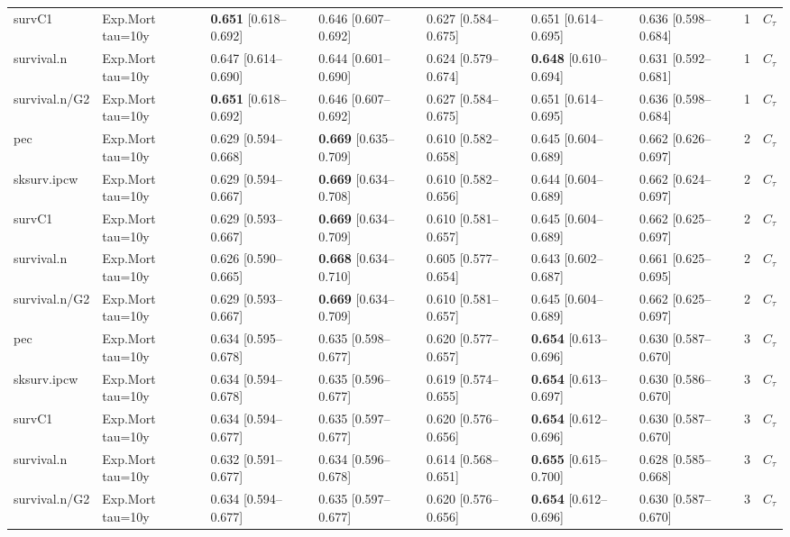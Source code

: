 \begin{tabular}{lllllllrl}
survC1 & Exp.Mort tau=10y & \textbf{0.651} [0.618–0.692] & 0.646 [0.607–0.692] & 0.627 [0.584–0.675] & 0.651 [0.614–0.695] & 0.636 [0.598–0.684] & 1 & $C_{\tau}$\\
survival.n & Exp.Mort tau=10y & 0.647 [0.614–0.690] & 0.644 [0.601–0.690] & 0.624 [0.579–0.674] & \textbf{0.648} [0.610–0.694] & 0.631 [0.592–0.681] & 1 & $C_{\tau}$\\
survival.n/G2 & Exp.Mort tau=10y & \textbf{0.651} [0.618–0.692] & 0.646 [0.607–0.692] & 0.627 [0.584–0.675] & 0.651 [0.614–0.695] & 0.636 [0.598–0.684] & 1 & $C_{\tau}$\\
\addlinespace
pec & Exp.Mort tau=10y & 0.629 [0.594–0.668] & \textbf{0.669} [0.635–0.709] & 0.610 [0.582–0.658] & 0.645 [0.604–0.689] & 0.662 [0.626–0.697] & 2 & $C_{\tau}$\\
sksurv.ipcw & Exp.Mort tau=10y & 0.629 [0.594–0.667] & \textbf{0.669} [0.634–0.708] & 0.610 [0.582–0.656] & 0.644 [0.604–0.689] & 0.662 [0.624–0.697] & 2 & $C_{\tau}$\\
survC1 & Exp.Mort tau=10y & 0.629 [0.593–0.667] & \textbf{0.669} [0.634–0.709] & 0.610 [0.581–0.657] & 0.645 [0.604–0.689] & 0.662 [0.625–0.697] & 2 & $C_{\tau}$\\
survival.n & Exp.Mort tau=10y & 0.626 [0.590–0.665] & \textbf{0.668} [0.634–0.710] & 0.605 [0.577–0.654] & 0.643 [0.602–0.687] & 0.661 [0.625–0.695] & 2 & $C_{\tau}$\\
survival.n/G2 & Exp.Mort tau=10y & 0.629 [0.593–0.667] & \textbf{0.669} [0.634–0.709] & 0.610 [0.581–0.657] & 0.645 [0.604–0.689] & 0.662 [0.625–0.697] & 2 & $C_{\tau}$\\
\addlinespace
pec & Exp.Mort tau=10y & 0.634 [0.595–0.678] & 0.635 [0.598–0.677] & 0.620 [0.577–0.657] & \textbf{0.654} [0.613–0.696] & 0.630 [0.587–0.670] & 3 & $C_{\tau}$\\
sksurv.ipcw & Exp.Mort tau=10y & 0.634 [0.594–0.678] & 0.635 [0.596–0.677] & 0.619 [0.574–0.655] & \textbf{0.654} [0.613–0.697] & 0.630 [0.586–0.670] & 3 & $C_{\tau}$\\
survC1 & Exp.Mort tau=10y & 0.634 [0.594–0.677] & 0.635 [0.597–0.677] & 0.620 [0.576–0.656] & \textbf{0.654} [0.612–0.696] & 0.630 [0.587–0.670] & 3 & $C_{\tau}$\\
survival.n & Exp.Mort tau=10y & 0.632 [0.591–0.677] & 0.634 [0.596–0.678] & 0.614 [0.568–0.651] & \textbf{0.655} [0.615–0.700] & 0.628 [0.585–0.668] & 3 & $C_{\tau}$\\
survival.n/G2 & Exp.Mort tau=10y & 0.634 [0.594–0.677] & 0.635 [0.597–0.677] & 0.620 [0.576–0.656] & \textbf{0.654} [0.612–0.696] & 0.630 [0.587–0.670] & 3 & $C_{\tau}$\\

\end{tabular}
